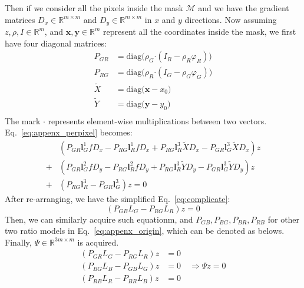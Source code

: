 Then if we consider all the pixels inside the mask $\mathcal{M}$ and we have the gradient matrices $D_x \in\mathbb{R}^{m\times m}$ and $D_y\in\mathbb{R}^{m\times m}$ in $x$ and $y$ directions. Now assuming $z,\rho, I \in\mathbb{R}^m$, and $\mathbf{x},\mathbf{y}\in\mathbb{R}^m$ represent all the coordinates inside the mask, we first have four diagonal matrices:
\begin{equation}
    \begin{split}
        P_{GR} &= \text{diag}\big(\rho_G \boldsymbol{\cdot} (I_R -\rho_R \varphi_R)\big)\\
        P_{RG} &= \text{diag}\big(\rho_R \boldsymbol{\cdot} (I_G -\rho_G \varphi_G)\big)\\
        \tilde{X} &= \text{diag}\big(\mathbf{x} - x_0 \big) \\
        \tilde{Y} &= \text{diag}\big(\mathbf{y} - y_0 \big) \\
    \end{split}
\end{equation}
The mark $\boldsymbol{\cdot}$ represents element-wise multiplications between two vectors. 
Eq.~\ref{eq:appenx_perpixel} becomes:
\begin{equation}\label{eq:complicate}
    \begin{split}
        &(P_{GR} \mathbf{l}_G^1 f D_x - P_{RG} \mathbf{l}_R^1 f D_x + P_{RG}\mathbf{l}_R^3 \tilde{X}D_x - P_{GR}\mathbf{l}_G^3 \tilde{X}D_x)z\\
        +&(P_{GR} \mathbf{l}_G^2 f D_y - P_{RG} \mathbf{l}_R^2 f D_y + P_{RG}\mathbf{l}_R^3 \tilde{Y}D_y - P_{GR}\mathbf{l}_G^3 \tilde{Y}D_y)z\\
        +& (P_{RG}\mathbf{l}_R^3 - P_{GR}\mathbf{l}_G^3)z = 0
    \end{split}
\end{equation}
After re-arranging, we have the simplified Eq.~\ref{eq:complicate}:
\begin{equation}
    (P_{GB}L_{G} - P_{RG}L_{R})z = 0
\end{equation}
Then, we can similarly acquire such equationm, and $P_{GB}, P_{BG}, P_{BR}, P_{RB}$ for other two ratio models in Eq.~\ref{eq:appenx_origin}, which can be denoted as belows. Finally, $\Psi\in\mathbb{R}^{3m\times m}$ is acquired.
\begin{equation}
\begin{split}
(P_{GR} L_G - P_{RG} L_R) z &= 0\\
(P_{BG} L_B - P_{GB} L_G)z &= 0 \quad \Rightarrow \Psi z = 0\\
(P_{RB} L_R - P_{BR}L_B) z&= 0 
\end{split}
\end{equation}

